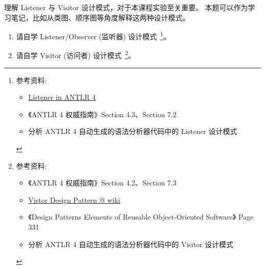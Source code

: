\documentclass[a4paper, justified]{tufte-handout}
\begin{document}
\begin{solution}
\end{solution}

\begin{problem}[设计模式]
  理解 Listener 与 Visitor 设计模式，对于本课程实验至关重要。
  本题可以作为学习笔记，比如从类图、顺序图等角度解释这两种设计模式。
  \begin{enumerate}[(1)]
    \item 请自学 Listener/Observer (监听器) 设计模式~\footnote{参考资料:
      \begin{itemize}
        \item \href{https://github.com/antlr/antlr4/blob/master/doc/listeners.md}{Listener in ANTLR 4}
        \item 《ANTLR 4 权威指南》Section 4.3、Section 7.2
        \item 分析 ANTLR 4 自动生成的语法分析器代码中的 Listener 设计模式
      \end{itemize}
    }。
    \item 请自学 Visitor (访问者) 设计模式~\footnote{参考资料:
      \begin{itemize}
        \item 《ANTLR 4 权威指南》Section 4.2、Section 7.3
        \item \href{https://en.wikipedia.org/wiki/Visitor_pattern}{Vistor Design Pattern @ wiki}
        \item 《Design Patterns Elements of Reusable Object-Oriented Software》 Page 331
        \item 分析 ANTLR 4 自动生成的语法分析器代码中的 Visitor 设计模式
      \end{itemize}
    }。
  \end{enumerate}
\end{problem}

\begin{solution}
\end{solution}
\end{document}
